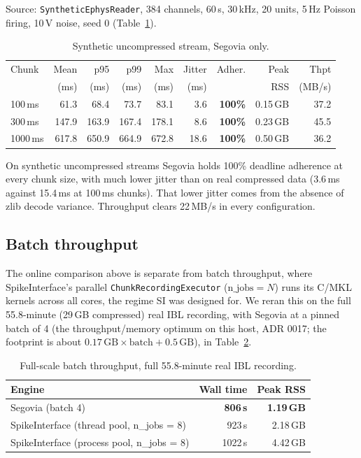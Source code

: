 \documentclass[11pt]{article}
\begin{document}
Source: \texttt{SyntheticEphysReader}, 384 channels, 60\,s, 30\,kHz, 20 units, 5\,Hz Poisson firing,
10\,\textmu V noise, seed 0 (Table~\ref{tab:synth}).

\begin{table}[h]
\centering
\small
\caption{Synthetic uncompressed stream, Segovia only.}
\label{tab:synth}
\begin{tabular}{lrrrrrrrr}
\toprule
Chunk & Mean & p95 & p99 & Max & Jitter & Adher. & Peak & Thpt \\
 & (ms) & (ms) & (ms) & (ms) & (ms) & & RSS & (MB/s) \\
\midrule
100\,ms & 61.3 & 68.4 & 73.7 & 83.1 & 3.6 & \textbf{100\%} & 0.15\,GB & 37.2 \\
300\,ms & 147.9 & 163.9 & 167.4 & 178.1 & 8.6 & \textbf{100\%} & 0.23\,GB & 45.5 \\
1000\,ms & 617.8 & 650.9 & 664.9 & 672.8 & 18.6 & \textbf{100\%} & 0.50\,GB & 36.2 \\
\bottomrule
\end{tabular}
\end{table}

On synthetic uncompressed streams Segovia holds 100\% deadline adherence at every chunk size, with much
lower jitter than on real compressed data (3.6\,ms against 15.4\,ms at 100\,ms chunks). That lower
jitter comes from the absence of zlib decode variance. Throughput clears 22\,MB/s in every
configuration.

\subsection{Batch throughput}

The online comparison above is separate from batch throughput, where SpikeInterface's parallel
\texttt{ChunkRecordingExecutor} ($\text{n\_jobs} = N$) runs its C/MKL kernels across all cores, the
regime SI was designed for. We reran this on the full 55.8-minute (29\,GB compressed) real IBL
recording, with Segovia at a pinned batch of 4 (the throughput/memory optimum on this host, ADR 0017;
the footprint is about $0.17\,\text{GB} \times \text{batch} + 0.5\,\text{GB}$), in Table~\ref{tab:batch}.

\begin{table}[h]
\centering
\small
\caption{Full-scale batch throughput, full 55.8-minute real IBL recording.}
\label{tab:batch}
\begin{tabular}{lrr}
\toprule
Engine & Wall time & Peak RSS \\
\midrule
Segovia (batch 4) & \textbf{806\,s} & \textbf{1.19\,GB} \\
SpikeInterface (thread pool, n\_jobs = 8) & 923\,s & 2.18\,GB \\
SpikeInterface (process pool, n\_jobs = 8) & 1022\,s & 4.42\,GB \\
\bottomrule
\end{tabular}
\end{table}
\end{document}
